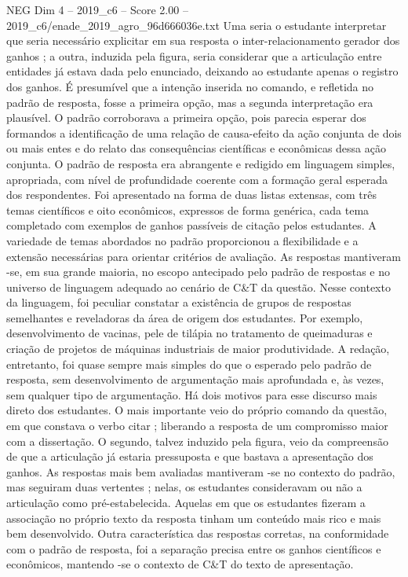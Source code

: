 \begin{textsample}{NEG Dim 4 – 2019\_c6 – Score 2.00 – 2019\_c6/enade\_2019\_agro\_96d666036e.txt}
Uma seria o estudante interpretar que seria necessário explicitar em sua resposta o inter-relacionamento gerador dos ganhos ; a outra, induzida pela figura, seria considerar que a articulação entre entidades já estava dada pelo enunciado, deixando ao estudante apenas o registro dos ganhos.
É presumível que a intenção inserida no comando, e refletida no padrão de resposta, fosse a primeira opção, mas a segunda interpretação era plausível.
O padrão corroborava a primeira opção, pois parecia esperar dos formandos a identificação de uma relação de causa-efeito da ação conjunta de dois ou mais entes e do relato das consequências científicas e econômicas dessa ação conjunta.
O padrão de resposta era abrangente e redigido em linguagem simples, apropriada, com nível de profundidade coerente com a formação geral esperada dos respondentes.
Foi apresentado na forma de duas listas extensas, com três temas científicos e oito econômicos, expressos de forma genérica, cada tema completado com exemplos de ganhos passíveis de citação pelos estudantes.
A variedade de temas abordados no padrão proporcionou a flexibilidade e a extensão necessárias para orientar critérios de avaliação.
As respostas mantiveram -se, em sua grande maioria, no escopo antecipado pelo padrão de respostas e no universo de linguagem adequado ao cenário de C\&T da questão.
Nesse contexto da linguagem, foi peculiar constatar a existência de grupos de respostas semelhantes e reveladoras da área de origem dos estudantes.
Por exemplo, desenvolvimento de vacinas, pele de tilápia no tratamento de queimaduras e criação de projetos de máquinas industriais de maior produtividade.
A redação, entretanto, foi quase sempre mais simples do que o esperado pelo padrão de resposta, sem desenvolvimento de argumentação mais aprofundada e, às vezes, sem qualquer tipo de argumentação.
Há dois motivos para esse discurso mais direto dos estudantes.
O mais importante veio do próprio comando da questão, em que constava o verbo citar ; liberando a resposta de um compromisso maior com a dissertação.
O segundo, talvez induzido pela figura, veio da compreensão de que a articulação já estaria pressuposta e que bastava a apresentação dos ganhos.
As respostas mais bem avaliadas mantiveram -se no contexto do padrão, mas seguiram duas vertentes ; nelas, os estudantes consideravam ou não a articulação como pré-estabelecida.
Aquelas em que os estudantes fizeram a associação no próprio texto da resposta tinham um conteúdo mais rico e mais bem desenvolvido.
Outra característica das respostas corretas, na conformidade com o padrão de resposta, foi a separação precisa entre os ganhos científicos e econômicos, mantendo -se o contexto de C\&T do texto de apresentação.

\end{textsample}
